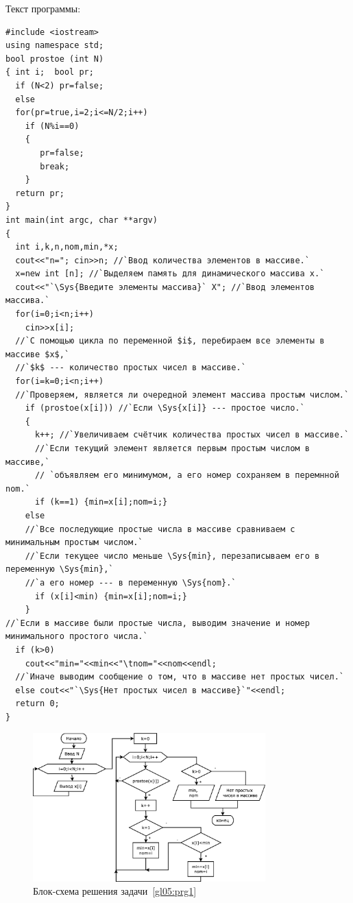 Текст программы:
\begin{lstlisting}
#include <iostream>
using namespace std;
bool prostoe (int N)
{ int i;  bool pr;
  if (N<2) pr=false;
  else
  for(pr=true,i=2;i<=N/2;i++)
    if (N%i==0)
    {
       pr=false;
       break;
    }
  return pr;
}
int main(int argc, char **argv)
{
  int i,k,n,nom,min,*x;
  cout<<"n="; cin>>n; //`Ввод количества элементов в массиве.`
  x=new int [n]; //`Выделяем память для динамического массива x.`
  cout<<"`\Sys{Введите элементы массива}` X"; //`Ввод элементов массива.`
  for(i=0;i<n;i++)
    cin>>x[i];
  //`С помощью цикла по переменной $i$, перебираем все элементы в массиве $x$,` 
  //`$k$ --- количество простых чисел в массиве.`
  for(i=k=0;i<n;i++)
  //`Проверяем, является ли очередной элемент массива простым числом.` 
    if (prostoe(x[i])) //`Если \Sys{x[i]} --- простое число.`
    {
      k++; //`Увеличиваем счётчик количества простых чисел в массиве.`
      //`Если текущий элемент является первым простым числом в массиве,`
      // `объявляем его минимумом, а его номер сохраняем в перемнной nom.`
      if (k==1) {min=x[i];nom=i;}
    else
    //`Все последующие простые числа в массиве сравниваем с минимальным простым числом.`
    //`Если текущее число меньше \Sys{min}, перезаписываем его в переменную \Sys{min},`
    //`а его номер --- в переменную \Sys{nom}.`
      if (x[i]<min) {min=x[i];nom=i;}
    }
//`Если в массиве были простые числа, выводим значение и номер минимального простого числа.`
  if (k>0)
    cout<<"min="<<min<<"\tnom="<<nom<<endl;
  //`Иначе выводим сообщение о том, что в массиве нет простых чисел.`
  else cout<<"`\Sys{Нет простых чисел в массиве}`"<<endl;
  return 0;
}
\end{lstlisting}


\begin{figure}[htb]
\begin{center}
\includegraphics[width=0.8\textwidth]{img/ris_5_8}
\caption{Блок-схема решения задачи~\ref{gl05:prg1}}
\label{ch05:refDrawing7}
\end{center}
\end{figure}



